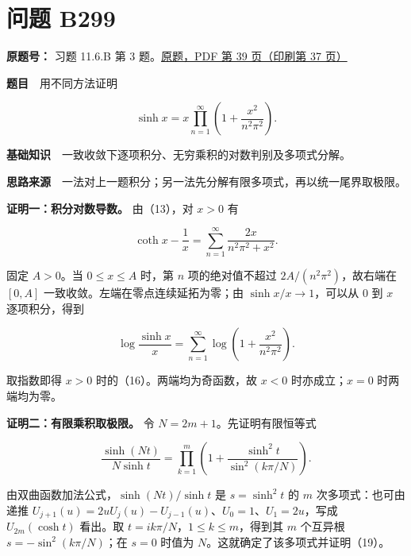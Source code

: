 \documentclass[11pt,a4paper]{article}
\begin{document}
\section{问题 B299}\label{ux95eeux9898-b299}

\textbf{原题号：} 习题 11.6.B 第 3
题。\href{https://zj139.github.io/math-notes/files/problems/楼分析习题-v2.pdf\#page=39}{原题，PDF
第 39 页（印刷第 37 页）}

\textbf{题目}　用不同方法证明

\begin{equation}
\sinh x=x\prod_{n=1}^{\infty}\left(1+\frac{x^2}{n^2\pi^2}\right).
\tag{16}
\end{equation}

\textbf{基础知识}　一致收敛下逐项积分、无穷乘积的对数判别及多项式分解。

\textbf{思路来源}　一法对上一题积分；另一法先分解有限多项式，再以统一尾界取极限。

\textbf{证明一：积分对数导数。} 由（13），对 \(x>0\) 有

\begin{equation}
\coth x-\frac1x
=\sum_{n=1}^{\infty}\frac{2x}{n^2\pi^2+x^2}.
\tag{17}
\end{equation}

固定 \(A>0\)。当 \(0\le x\le A\) 时，第 \(n\) 项的绝对值不超过
\(2A/(n^2\pi^2)\)，故右端在 \([0,A]\)
一致收敛。左端在零点连续延拓为零；由 \(\sinh x/x\to1\)，可以从 \(0\) 到
\(x\) 逐项积分，得到

\begin{equation}
\log\frac{\sinh x}{x}
=\sum_{n=1}^{\infty}\log\left(1+\frac{x^2}{n^2\pi^2}\right).
\tag{18}
\end{equation}

取指数即得 \(x>0\) 时的（16）。两端均为奇函数，故 \(x<0\)
时亦成立；\(x=0\) 时两端均为零。

\textbf{证明二：有限乘积取极限。} 令 \(N=2m+1\)。先证明有限恒等式

\begin{equation}
\frac{\sinh(Nt)}{N\sinh t}
=\prod_{k=1}^{m}\left(1+\frac{\sinh^2t}{\sin^2(k\pi/N)}\right).
\tag{19}
\end{equation}

由双曲函数加法公式，\(\sinh(Nt)/\sinh t\) 是 \(s=\sinh^2t\) 的 \(m\)
次多项式：也可由递推
\(U_{j+1}(u)=2uU_j(u)-U_{j-1}(u)\)、\(U_0=1\)、\(U_1=2u\)，写成
\(U_{2m}(\cosh t)\) 看出。取 \(t=ik\pi/N\)，\(1\le k\le m\)，得到其
\(m\) 个互异根 \(s=-\sin^2(k\pi/N)\)；在 \(s=0\) 时值为
\(N\)。这就确定了该多项式并证明（19）。
\end{document}
